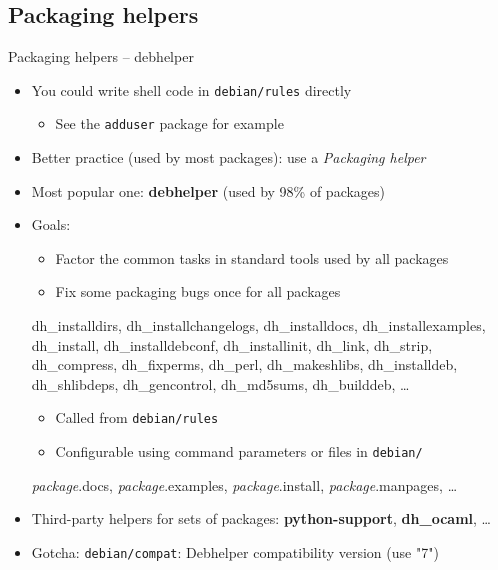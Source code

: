 \documentclass[10pt,final]{beamer}
\begin{document}
\subsection{Packaging helpers}
\begin{frame}{Packaging helpers -- debhelper}
  \begin{itemize}
  \item You could write shell code in \texttt{debian/rules} directly
    \begin{itemize}
    \item See the \texttt{adduser} package for example
    \end{itemize}
    \hbr
  \item Better practice (used by most packages): use a \textsl{Packaging helper}
    \hbr
  \item Most popular one: \textbf{debhelper} (used by 98\% of packages)
    \hbr
  \item Goals:
    \begin{itemize}
    \item Factor the common tasks in standard tools used by all packages
    \item Fix some packaging bugs once for all packages
    \end{itemize}
    {\footnotesize dh\_installdirs, dh\_installchangelogs, dh\_installdocs,
      dh\_installexamples, dh\_install, dh\_installdebconf, dh\_installinit,
      dh\_link, dh\_strip, dh\_compress, dh\_fixperms, dh\_perl,
      dh\_makeshlibs, dh\_installdeb, dh\_shlibdeps, dh\_gencontrol,
      dh\_md5sums, dh\_builddeb, \ldots}
    \begin{itemize}
    \item Called from \texttt{debian/rules}
    \item Configurable using command parameters or files in \texttt{debian/}
    \end{itemize}
    {\footnotesize \ttfamily \textsl{package}.docs, \textsl{package}.examples,
      \textsl{package}.install, \textsl{package}.manpages, \ldots} \hbr
  \item Third-party helpers for sets of packages: \textbf{python-support},
    \textbf{dh\_ocaml}, \ldots \hbr
  \item Gotcha: \texttt{debian/compat}: Debhelper compatibility version (use "7")
  \end{itemize}
\end{frame}
\end{document}
